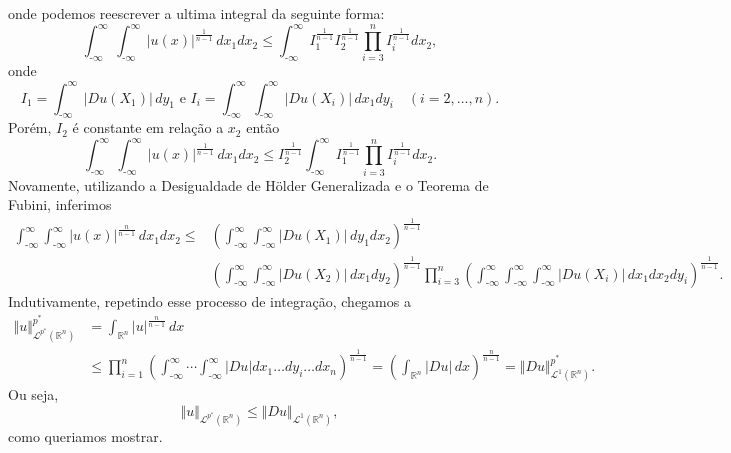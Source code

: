 \documentclass[a4paper, 11pt]{book}
\theoremstyle{definition}
\newcommand{\m}{\text{-}}
\newcommand{\bR}{\mathbb{R}}
\newcommand{\cL}{\mathcal{L}}
\begin{document}
\begin{prf}
\[    \]
    onde podemos reescrever a ultima integral da seguinte forma:
    \[
        \int_{\m\infty}^{\infty}\int_{\m\infty}^{\infty} |u(x)|^{\frac{1}{n-1}} \,dx_1dx_2 \leqslant \int_{\m\infty}^{\infty} I_1^{\frac{1}{n-1}}I_2^{\frac{1}{n-1}}\prod_{i=3}^n I_i^{\frac{1}{n-1}} dx_2,
    \]
    onde
    \[
        I_1 = \int_{\m\infty}^{\infty} |Du(X_1)| \,dy_1 \text{ e } I_i = \int_{\m\infty}^{\infty} \!\int_{\m\infty}^{\infty} |Du(X_i)| \, dx_1dy_i \quad(i = 2,\dots,n).
    \]
    Porém, $I_2$ é constante em relação a $x_2$ então
    \[
        \int_{\m\infty}^{\infty}\int_{\m\infty}^{\infty} |u(x)|^{\frac{1}{n-1}} \,dx_1dx_2 \leqslant I_2^{\frac{1}{n-1}}\int_{\m\infty}^{\infty} I_1^{\frac{1}{n-1}}\prod_{i=3}^n I_i^{\frac{1}{n-1}} dx_2.
    \]
    Novamente, utilizando a Desigualdade de Hölder Generalizada e o Teorema de Fubini, inferimos
    {\small
    \[
        \begin{aligned}
            \int_{\m\infty}^{\infty}\int_{\m\infty}^{\infty} |u(x)|^{\frac{n}{n-1}} \,dx_1dx_2 \leqslant &\left( \int_{\m\infty}^{\infty} \int_{\m\infty}^{\infty} |Du(X_1)| \,dy_1 dx_2 \right)^{\frac{1}{n-1}}\\ &\left( \int_{\m\infty}^{\infty} \int_{\m\infty}^{\infty} |Du(X_2)| \,dx_1 dy_2 \right)^{\frac{1}{n-1}} \prod_{i=3}^n \left( \int_{\m\infty}^{\infty}\int_{\m\infty}^{\infty}\int_{\m\infty}^{\infty} |Du(X_i)| \,dx_1dx_2dy_i \right)^{\frac{1}{n-1}} \!\!.
        \end{aligned}
    \]\!}
    Indutivamente, repetindo esse processo de integração, chegamos a
    \[
        \begin{aligned}
            \Vert u \Vert_{\cL^{p^*}(\bR^n)}^{p^*} &= \int_{\bR^n} |u|^{\frac{n}{n-1}} \, dx \\
            &\leqslant \prod_{i=1}^n \left( \int_{\m\infty}^{\infty} \cdots \int_{\m\infty}^\infty |Du| dx_1\dots dy_i \dots dx_n \right)^{\frac{1}{n-1}}
            = \left(\int_{\bR^n} |Du|\,dx\right)^{\frac{n}{n-1}} = \Vert Du \Vert_{\cL^1(\bR^n)}^{p^*}.
        \end{aligned}
    \]
    Ou seja,
    \begin{equation} \label{eq:desigualdadegnss}
        \Vert u \Vert_{\cL^{p^*}(\bR^n)} \leqslant\Vert Du \Vert_{\cL^1(\bR^n)},
    \end{equation}
    como queriamos mostrar.


\end{prf}
\end{document}
